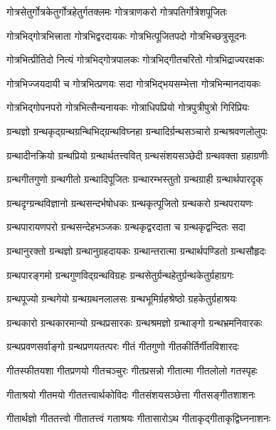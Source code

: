 \twolineshloka
{गोत्रसेतुर्गोत्रकेतुर्गोत्रहेतुर्गतक्लमः}%
{गोत्रत्राणकरो गोत्रपतिर्गोत्रेशपूजितः}%

\twolineshloka
{गोत्रभिद्गोत्रभित्त्राता गोत्रभिद्वरदायकः}%
{गोत्रभित्पूजितपदो गोत्रभिच्छत्रुसूदनः}%

\twolineshloka
{गोत्रभित्प्रीतिदो नित्यं गोत्रभिद्गोत्रपालकः}%
{गोत्रभिद्गीतचरितो गोत्रभिद्राज्यरक्षकः}%

\twolineshloka
{गोत्रभिज्जयदायी च गोत्रभित्प्रणयः सदा}%
{गोत्रभिद्भयसम्भेत्ता गोत्रभिन्मानदायकः}%

\twolineshloka
{गोत्रभिद्गोपनपरो गोत्रभित्सैन्यनायकः}%
{गोत्राधिपप्रियो गोत्रपुत्रीपुत्रो गिरिप्रियः}%

\twolineshloka
{ग्रन्थज्ञो ग्रन्थकृद्ग्रन्थग्रन्थिभिद्ग्रन्थविघ्नहा}%
{ग्रन्थादिर्ग्रन्थसञ्चारो ग्रन्थश्रवणलोलुपः}%

\twolineshloka
{ग्रन्थादीनक्रियो ग्रन्थप्रियो ग्रन्थार्थतत्त्ववित्}%
{ग्रन्थसंशयसञ्छेदी ग्रन्थवक्ता ग्रहाग्रणीः}%

\twolineshloka
{ग्रन्थगीतगुणो ग्रन्थगीतो ग्रन्थादिपूजितः}%
{ग्रन्थारम्भस्तुतो ग्रन्थग्राही ग्रन्थार्थपारदृक्}%

\twolineshloka
{ग्रन्थदृग्ग्रन्थविज्ञानो ग्रन्थसन्दर्भषोधकः}%
{ग्रन्थकृत्पूजितो ग्रन्थकरो ग्रन्थपरायणः}%

\twolineshloka
{ग्रन्थपारायणपरो ग्रन्थसन्देहभञ्जकः}%
{ग्रन्थकृद्वरदाता च ग्रन्थकृद्वन्दितः सदा}%

\twolineshloka
{ग्रन्थानुरक्तो ग्रन्थज्ञो ग्रन्थानुग्रहदायकः}%
{ग्रन्थान्तरात्मा ग्रन्थार्थपण्डितो ग्रन्थसौहृदः}%

\twolineshloka
{ग्रन्थपारङ्गमो ग्रन्थगुणविद्ग्रन्थविग्रहः}%
{ग्रन्थसेतुर्ग्रन्थहेतुर्ग्रन्थकेतुर्ग्रहाग्रगः}%

\twolineshloka
{ग्रन्थपूज्यो ग्रन्थगेयो ग्रन्थग्रथनलालसः}%
{ग्रन्थभूमिर्ग्रहश्रेष्ठो ग्रहकेतुर्ग्रहाश्रयः}%

\twolineshloka
{ग्रन्थकारो ग्रन्थकारमान्यो ग्रन्थप्रसारकः}%
{ग्रन्थश्रमज्ञो ग्रन्थाङ्गो ग्रन्थभ्रमनिवारकः}%

\twolineshloka
{ग्रन्थप्रवणसर्वाङ्गो ग्रन्थप्रणयतत्परः}%
{गीतं गीतगुणो गीतकीर्तिर्गीतविशारदः}%

\twolineshloka
{गीतस्फीतयशा गीतप्रणयो गीतचञ्चुरः}%
{गीतप्रसन्नो गीतात्मा गीतलोलो गतस्पृहः}%

\twolineshloka
{गीताश्रयो गीतमयो गीततत्त्वार्थकोविदः}%
{गीतसंशयसञ्छेत्ता गीतसङ्गीतशाशनः}%

\twolineshloka
{गीतार्थज्ञो गीततत्त्वो गीतातत्त्वं गताश्रयः}%
{गीतासारोऽथ गीताकृद्गीताकृद्विघ्ननाशनः}%

